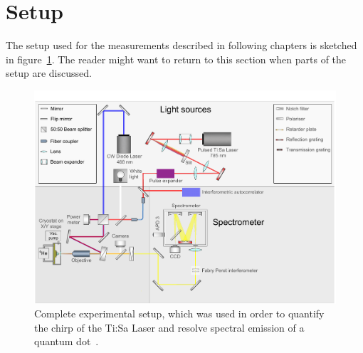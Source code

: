 \section{Setup}

The setup used for the measurements described in following chapters is sketched in figure~\ref{fig:setupflat}.
The reader might want to return to this section when parts of the setup are discussed.

\begin{figure}[H]
	\centering
	\includegraphics[width=\linewidth]{figures/setup/Setup_flat}
	\caption[Complete experimental setup]{Complete experimental setup, which was used in order to quantify the chirp of the Ti:Sa Laser and resolve spectral emission of a quantum dot~\cite{schimpf_towards_2017}.}
	\label{fig:setupflat}
\end{figure}
